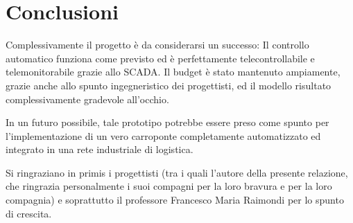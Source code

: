 \section{Conclusioni}

Complessivamente il progetto è da considerarsi un successo: Il controllo automatico funziona come
previsto ed è perfettamente telecontrollabile e telemonitorabile grazie allo SCADA. Il budget è
stato mantenuto ampiamente, grazie anche allo spunto ingegneristico dei progettisti, ed il modello
risultato complessivamente gradevole all'occhio.

In un futuro possibile, tale prototipo potrebbe essere preso come spunto per l'implementazione di un
vero carroponte completamente automatizzato ed integrato in una rete industriale di logistica.

Si ringraziano in primis i progettisti (tra i quali l'autore della presente relazione, che ringrazia
personalmente i suoi compagni per la loro bravura e per la loro compagnia) e soprattutto il
professore Francesco Maria Raimondi per lo spunto di crescita.

\printbibliography
\clearpage





